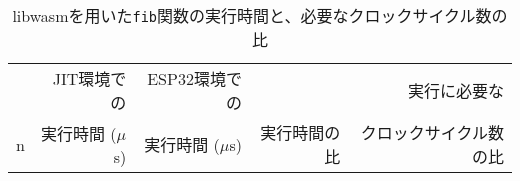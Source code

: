 \begin{table}[htbp]
  \caption{libwasmを用いた{\tt fib}関数の実行時間と、必要なクロックサイクル数の比}
  \label{tab:fib_time}
  \begin{center}
    \begin{tabular}{rrrrr}
      \hline
      & JIT環境での       & ESP32環境での     &            & 実行に必要な \\
      n & 実行時間 ($\mu$s) & 実行時間 ($\mu$s) & 実行時間の比 & クロックサイクル数の比 \\ \hline \hline

\end{tabular}
\end{center}
\end{table}
